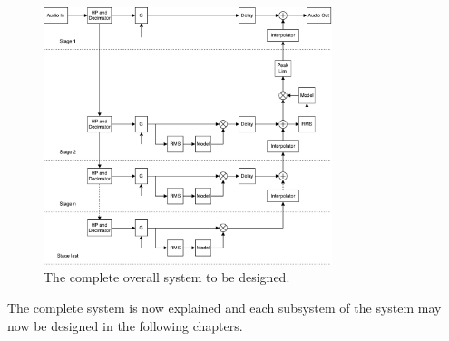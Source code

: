 \begin{figure}[H]
\centering
\includegraphics[width=0.75\textwidth]{figures/designRealFull.pdf}
\caption{The complete overall system to be designed.}
\label{fig:designRealBlock}
\end{figure}


The complete system is now explained and each subsystem of the system may now be designed in the following chapters.
